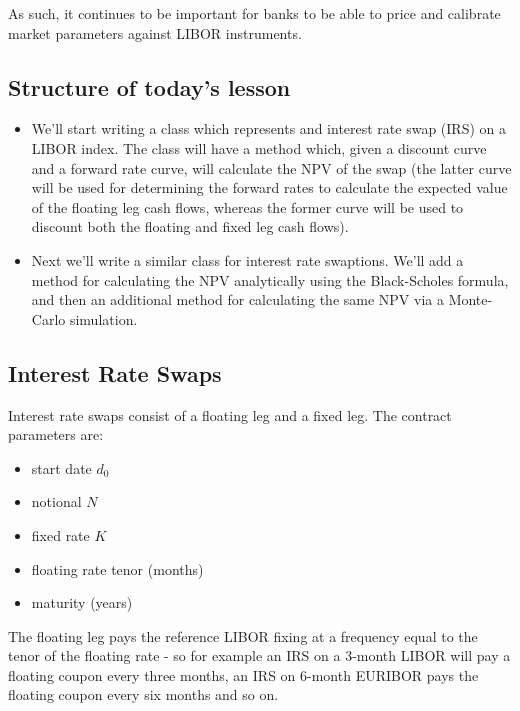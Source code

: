 \documentclass[11pt]{article}
\providecommand{\tightlist}{%
      \setlength{\itemsep}{0pt}\setlength{\parskip}{0pt}}
\begin{document}
As such, it continues to be important for banks to be able to price and
calibrate market parameters against LIBOR instruments.

    \hypertarget{structure-of-todays-lesson}{%
\subsection{Structure of today's
lesson}\label{structure-of-todays-lesson}}

\begin{itemize}
\item
  We'll start writing a class which represents and interest rate swap
  (IRS) on a LIBOR index. The class will have a method which, given a
  discount curve and a forward rate curve, will calculate the NPV of the
  swap (the latter curve will be used for determining the forward rates
  to calculate the expected value of the floating leg cash flows,
  whereas the former curve will be used to discount both the floating
  and fixed leg cash flows).
\item
  Next we'll write a similar class for interest rate swaptions. We'll
  add a method for calculating the NPV analytically using the
  Black-Scholes formula, and then an additional method for calculating
  the same NPV via a Monte-Carlo simulation.
\end{itemize}

    \hypertarget{interest-rate-swaps}{%
\subsection{Interest Rate Swaps}\label{interest-rate-swaps}}

Interest rate swaps consist of a floating leg and a fixed leg. The
contract parameters are:

\begin{itemize}
\tightlist
\item
  start date \(d_0\)
\item
  notional \(N\)
\item
  fixed rate \(K\)
\item
  floating rate tenor (months)
\item
  maturity (years)
\end{itemize}

The floating leg pays the reference LIBOR fixing at a frequency equal to
the tenor of the floating rate - so for example an IRS on a 3-month
LIBOR will pay a floating coupon every three months, an IRS on 6-month
EURIBOR pays the floating coupon every six months and so on.
\end{document}

